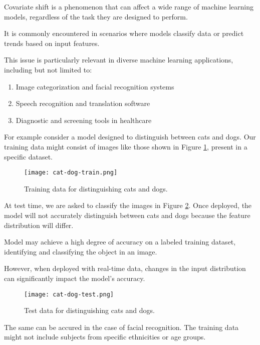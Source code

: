 Covariate shift is a phenomenon that can affect a wide range of machine learning models, regardless of the task they are designed to perform.

It is commonly encountered in scenarios where models classify data or predict trends based on input features.

This issue is particularly relevant in diverse machine learning applications, including but not limited to:
	
	\begin{enumerate}
		\item Image categorization and facial recognition systems
		\item Speech recognition and translation software
		\item Diagnostic and screening tools in healthcare
	\end{enumerate}
	
For example consider a model designed to distinguish between cats and dogs. Our training data might consist of images like those shown in Figure \ref{cani-gatti-tr}, present in a specific dataset.
	
	\vspace{1cm}
	\begin{figure}[h!]
		\centering
		\texttt{[image: cat-dog-train.png]} 
		\caption{Training data for distinguishing cats and dogs.}
		\label{cani-gatti-tr}
	\end{figure}
     \vspace{1cm}
     

At test time, we are asked to classify the images in Figure \ref{cani-gatti-ts}. Once deployed, the model will not accurately distinguish between cats and dogs because the feature distribution will differ.

Model may achieve a high degree of accuracy on a labeled training dataset, identifying and classifying the object in an image. 

However, when deployed with real-time data, changes in the input distribution can significantly impact the model's accuracy.
		
	\vspace{1cm}
	\begin{figure}[h!]
		\centering
		\texttt{[image: cat-dog-test.png]} 
		\caption{Test data for distinguishing cats and dogs.}
		\label{cani-gatti-ts}
	\end{figure}
	\vspace{1cm}
	
The same can be accured in the case of facial recognition. The training data might not include subjects from specific ethnicities or age groups.

